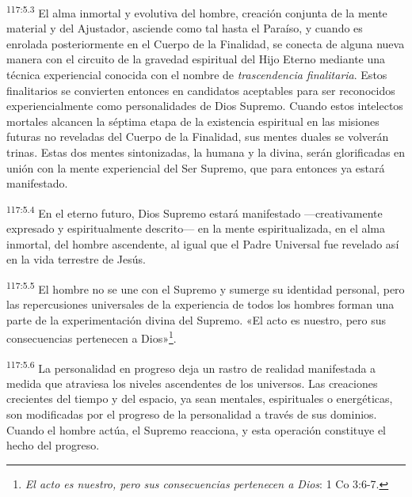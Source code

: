 \par
\textsuperscript{117:5.3} El alma inmortal y evolutiva del hombre, creación conjunta de la mente material y del Ajustador, asciende como tal hasta el Paraíso, y cuando es enrolada posteriormente en el Cuerpo de la Finalidad, se conecta de alguna nueva manera con el circuito de la gravedad espiritual del Hijo Eterno mediante una técnica experiencial conocida con el nombre de \textit{trascendencia finalitaria}. Estos finalitarios se convierten entonces en candidatos aceptables para ser reconocidos experiencialmente como personalidades de Dios Supremo. Cuando estos intelectos mortales alcancen la séptima etapa de la existencia espiritual en las misiones futuras no reveladas del Cuerpo de la Finalidad, sus mentes duales se volverán trinas. Estas dos mentes sintonizadas, la humana y la divina, serán glorificadas en unión con la mente experiencial del Ser Supremo, que para entonces ya estará manifestado.

\par
\textsuperscript{117:5.4} En el eterno futuro, Dios Supremo estará manifestado ---creativamente expresado y espiritualmente descrito--- en la mente espiritualizada, en el alma inmortal, del hombre ascendente, al igual que el Padre Universal fue revelado así en la vida terrestre de Jesús.

\par
\textsuperscript{117:5.5} El hombre no se une con el Supremo y sumerge su identidad personal, pero las repercusiones universales de la experiencia de todos los hombres forman una parte de la experimentación divina del Supremo. «El acto es nuestro, pero sus consecuencias pertenecen a Dios»\footnote{\textit{El acto es nuestro, pero sus consecuencias pertenecen a Dios}: 1 Co 3:6-7.}.

\par
\textsuperscript{117:5.6} La personalidad en progreso deja un rastro de realidad manifestada a medida que atraviesa los niveles ascendentes de los universos. Las creaciones crecientes del tiempo y del espacio, ya sean mentales, espirituales o energéticas, son modificadas por el progreso de la personalidad a través de sus dominios. Cuando el hombre actúa, el Supremo reacciona, y esta operación constituye el hecho del progreso.

